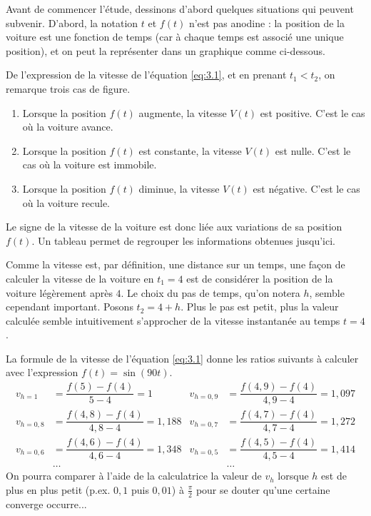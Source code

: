 Avant de commencer l'étude, dessinons d'abord quelques situations qui peuvent subvenir.
D'abord, la notation $t$ et $f(t)$ n'est pas anodine : la position de la voiture est une fonction de temps (car à chaque temps est associé une unique position), et on peut la représenter dans un graphique comme ci-dessous.


De l'expression de la vitesse de l'équation \eqref{eq:3.1}, et en prenant $t_1 < t_2$, on remarque trois cas de figure.
\begin{enumerate}
	\item Lorsque la position $f(t)$ augmente, la vitesse $V(t)$ est positive. 
	C'est le cas où la voiture avance.
	\item Lorsque la position $f(t)$ est constante, la vitesse $V(t)$ est nulle.
	C'est le cas où la voiture est immobile. 
	\item Lorsque la position $f(t)$ diminue, la vitesse $V(t)$ est négative.
	C'est le cas où la voiture recule.
\end{enumerate}
Le signe de la vitesse de la voiture est donc liée aux variations de sa position $f(t)$.
Un tableau permet de regrouper les informations obtenues jusqu'ici.
	

Comme la vitesse est, par définition, une distance sur un temps, une façon de calculer la vitesse de la voiture en $t_1=4$ est de considérer la position de la voiture légèrement après $4$.
Le choix du pas de temps, qu'on notera $h$, semble cependant important. Posons $t_2 = 4+h$.
Plus le pas est petit, plus la valeur calculée semble intuitivement s'approcher de la vitesse instantanée au temps $t=4$.

La formule de la vitesse de l'équation \eqref{eq:3.1} donne les ratios suivants à calculer avec l'expression $f(t) = \sin(90t)$.
\begin{align*}
	v_{h=1} &= \dfrac{f(5) - f(4)}{5-4} = 1 & v_{h=0,9} &=  \dfrac{f(4,9) - f(4)}{4,9-4} = 1,097 \\
	v_{h=0,8} &=  \dfrac{f(4,8) - f(4)}{4,8-4} = 1,188 & v_{h=0,7} &=  \dfrac{f(4,7) - f(4)}{4,7-4} = 1,272 \\
	v_{h=0,6} &=  \dfrac{f(4,6) - f(4)}{4,6-4} = 1,348 & v_{h=0,5} &=  \dfrac{f(4,5) - f(4)}{4,5-4} = 1,414 \\
	&\dots & &\dots
\end{align*}
On pourra comparer à l'aide de la calculatrice la valeur de $v_{h}$ lorsque $h$ est de plus en plus petit (p.ex. $0,1$ puis $0,01$) à $\frac\pi2$ pour se douter qu'une certaine converge occurre...

